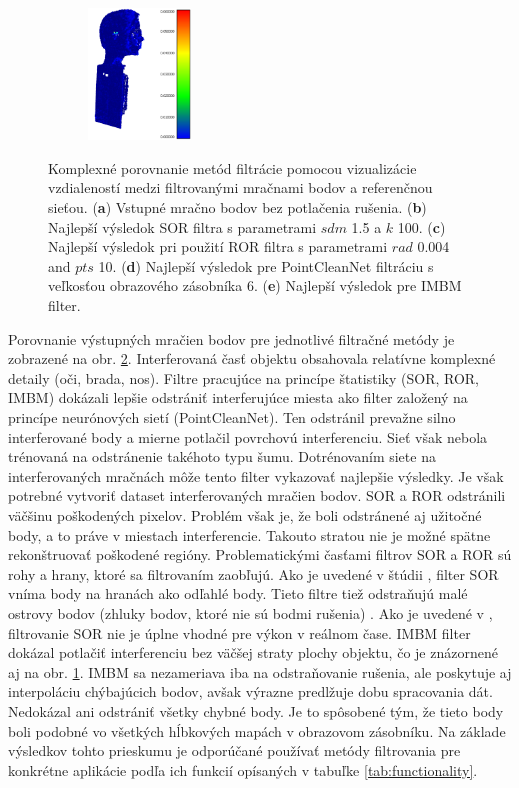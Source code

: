 \begin{figure}[H]
\begin{subfigure}[b]{0.19\textwidth}
		\centering
		\includegraphics[height=3.5cm]{figures/imbm_best.png}
		\caption{}
		\label{fig:best:e}
	\end{subfigure}
	\caption{Komplexné porovnanie metód filtrácie pomocou vizualizácie vzdialeností medzi filtrovanými mračnami bodov a referenčnou sieťou. (\textbf{a}) Vstupné mračno bodov bez potlačenia rušenia. (\textbf{b}) Najlepší výsledok SOR filtra s parametrami $sdm$ 1.5 a $k$ 100. (\textbf{c}) Najlepší výsledok pri použití ROR filtra s parametrami $rad$ 0.004 and $pts$ 10. (\textbf{d}) Najlepší výsledok pre PointCleanNet filtráciu s veľkosťou obrazového zásobníka 6. (\textbf{e}) Najlepší výsledok pre IMBM filter.}
	\label{fig:best}
\end{figure}

Porovnanie výstupných mračien bodov pre jednotlivé filtračné metódy je zobrazené na obr. \ref{fig:best}. Interferovaná časť objektu obsahovala relatívne komplexné detaily (oči, brada, nos). Filtre pracujúce na princípe štatistiky (SOR, ROR, IMBM) dokázali lepšie odstrániť interferujúce miesta ako filter založený na princípe neurónových sietí (PointCleanNet). Ten odstránil prevažne silno interferované body a mierne potlačil povrchovú interferenciu. Sieť však nebola trénovaná na odstránenie takéhoto typu šumu. Dotrénovaním siete na interferovaných mračnách môže tento filter vykazovať najlepšie výsledky. Je však potrebné vytvoriť dataset interferovaných mračien bodov. SOR a ROR odstránili väčšinu poškodených pixelov. Problém však je, že boli odstránené aj užitočné body, a to práve v miestach interferencie. Takouto stratou nie je možné spätne rekonštruovať poškodené regióny. Problematickými časťami filtrov SOR a ROR sú rohy a hrany, ktoré sa filtrovaním zaobľujú. Ako je uvedené v štúdii \cite{Pirate}, filter SOR vníma body na hranách ako odľahlé body. Tieto filtre tiež odstraňujú malé ostrovy bodov (zhluky bodov, ktoré nie sú bodmi rušenia) \cite{Schaller}. Ako je uvedené v \cite{Balta}, filtrovanie SOR nie je úplne vhodné pre výkon v reálnom čase. IMBM filter dokázal potlačiť interferenciu bez väčšej straty plochy objektu, čo je znázornené aj na obr. \ref{fig:best:e}. IMBM sa nezameriava iba na odstraňovanie rušenia, ale poskytuje aj interpoláciu chýbajúcich bodov, avšak výrazne predlžuje dobu spracovania dát.  Nedokázal ani odstrániť všetky chybné body. Je to spôsobené tým, že tieto body boli podobné vo všetkých hĺbkových mapách v obrazovom zásobníku. Na základe výsledkov tohto prieskumu je odporúčané používať metódy filtrovania pre konkrétne aplikácie podľa ich funkcií opísaných v tabuľke \ref{tab:functionality}.

